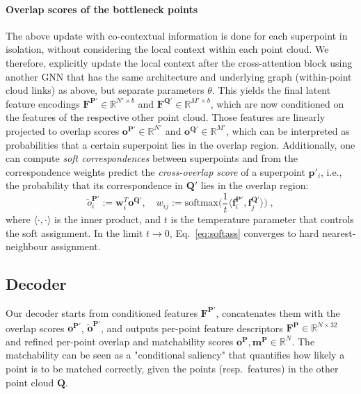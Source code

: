 \paragraph{Overlap scores of the bottleneck points}
The above update with co-contextual information is done for each superpoint in isolation, without considering the local context within each point cloud.
We therefore, explicitly update the local context after the cross-attention block using another GNN that has the same architecture and underlying graph (within-point cloud links) as above, but separate parameters $\theta$.
This yields the final latent feature encodings  $\mathbf{F}^{\mathbf{P}'}\!\!\in\!\mathbb{R}^{N'\!\times b}$ and $\mathbf{F}^{\mathbf{Q}'}\!\!\in\!\mathbb{R}^{M'\!\times b}$, which are now conditioned on the features of the respective other point cloud.
Those features are linearly projected to overlap scores $\mathbf{o}^{\mathbf{P}'}\!\!\in\!\mathbb{R}^{N'}$ and $\mathbf{o}^{\mathbf{Q}'}\!\!\in\!\mathbb{R}^{M'}$, which can be interpreted as probabilities that a certain superpoint lies in the overlap region.
Additionally, one can compute \emph{soft correspondences} between superpoints and from the correspondence weights predict the \emph{cross-overlap score} of a superpoint $\mathbf{p}'_i$, i.e., the probability that its
correspondence in $\mathbf{Q}'$ lies in the overlap region:
\begin{equation}
    \tilde{o}_i^{\mathbf{P}'}:= \mathbf{w}_i^{T} \mathbf{o}^{\mathbf{Q}'}, \quad w_{ij} := \mathrm{softmax}\big(\frac{1}{t}\langle\mathbf{f}^{\mathbf{P}'}_i, \mathbf{f}^{\mathbf{Q}'}_j\rangle\big)\;,
    \label{eq:softass}
\end{equation}
where $\langle \cdot,\cdot \rangle$ is the inner product, and $t$ is the temperature parameter that controls the soft assignment. In the limit $t\!\rightarrow\!0$, Eq.~\eqref{eq:softass} converges to hard nearest-neighbour assignment.






\subsection{Decoder}
\label{sec:method_decoder}
Our decoder starts from conditioned features $\mathbf{F}^{\mathbf{P}'}$, concatenates them with the overlap scores $\mathbf{o}^{\mathbf{P}'}$, $\tilde{\mathbf{o}}^{\mathbf{P}'}$, and outputs per-point feature descriptors $\mathbf{F}^{\mathbf{P}}\!\!\in\!\mathbb{R}^{N\times32}$ and refined per-point overlap and matchability scores $\mathbf{o}^{\mathbf{P}},\mathbf{m}^{\mathbf{P}}\!\in \!\mathbb{R}^{N}$.
The matchability can be seen as a "conditional saliency" that quantifies how likely a point is to be matched correctly, given the points (resp.\ features) in the other point cloud $\mathbf{Q}$.

